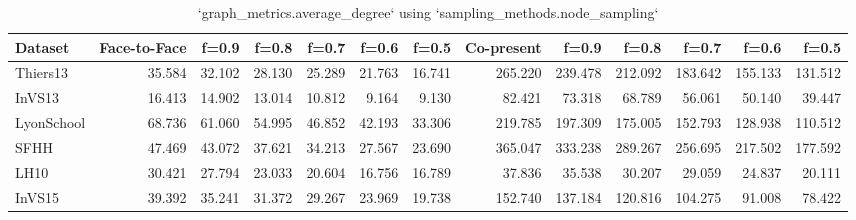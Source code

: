 \begin{table}[ht]
\begin{tabular}{lrrrrrrrrrrrr}
\hline
 Dataset    &   Face-to-Face &   f=0.9 &   f=0.8 &   f=0.7 &   f=0.6 &   f=0.5 &   Co-present &   f=0.9 &   f=0.8 &   f=0.7 &   f=0.6 &   f=0.5 \\
\hline
 Thiers13   &         35.584 &  32.102 &  28.130 &  25.289 &  21.763 &  16.741 &      265.220 & 239.478 & 212.092 & 183.642 & 155.133 & 131.512 \\
 InVS13     &         16.413 &  14.902 &  13.014 &  10.812 &   9.164 &   9.130 &       82.421 &  73.318 &  68.789 &  56.061 &  50.140 &  39.447 \\
 LyonSchool &         68.736 &  61.060 &  54.995 &  46.852 &  42.193 &  33.306 &      219.785 & 197.309 & 175.005 & 152.793 & 128.938 & 110.512 \\
 SFHH       &         47.469 &  43.072 &  37.621 &  34.213 &  27.567 &  23.690 &      365.047 & 333.238 & 289.267 & 256.695 & 217.502 & 177.592 \\
 LH10       &         30.421 &  27.794 &  23.033 &  20.604 &  16.756 &  16.789 &       37.836 &  35.538 &  30.207 &  29.059 &  24.837 &  20.111 \\
 InVS15     &         39.392 &  35.241 &  31.372 &  29.267 &  23.969 &  19.738 &      152.740 & 137.184 & 120.816 & 104.275 &  91.008 &  78.422 \\
\hline
\end{tabular}
\caption{`graph_metrics.average_degree` using `sampling_methods.node_sampling`}
\end{table}